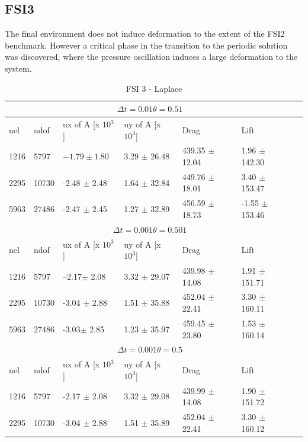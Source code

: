 \subsection{FSI3}
The final environment does not induce deformation to the extent of the FSI2 benchmark. However a critical phase in the transition to the periodic solution was discovered, where the pressure oscillation induces a large deformation to the system.
\begin{table}[h!]
\centering
\caption{FSI 3 - Laplace}
\label{my-label}
\begin{tabular}{ |p{1cm}||p{1cm}|p{2.5cm}|p{2.5cm}|p{2.7cm}|p{2.7cm}|p{1.2cm}|}
 \hline
  \multicolumn{6}{|c|}{$\Delta t = 0.01 \theta = 0.51$} \\
   \hline
nel & ndof & ux of A [x $10^{3}$]  &uy of A [x $10^{3}$]& Drag  & Lift \\
 \hline
1216 &5797& $-1.79 \pm  1.80$  & 3.29 $\pm$  26.48 & 439.35  $\pm$  12.04 &  1.96 $\pm$  142.30 \\
2295 &10730& -2.48 $\pm$  2.48 &1.64 $\pm$  32.84   & 449.76   $\pm$  18.01 &  3.40  $\pm$  153.47\\
5963 &27486 & -2.47   $\pm$  2.45 &1.27 $\pm$  32.89 & 456.59  $\pm$  18.73 &  -1.55  $\pm$  153.46\\
 \hline
  \multicolumn{6}{|c|}{$\Delta t = 0.001 \theta = 0.501$} \\
   \hline
 nel & ndof & ux of A [x $10^{3}$]  &uy of A [x $10^{3}$]& Drag  & Lift \\
1216 &5797& --2.17$\pm$  2.08 &     3.32     $\pm$  29.07 &439.98 $\pm$  14.08  &  1.91 $\pm$  151.71\\
2295 &10730& -3.04 $\pm$  2.88 &  1.51  $\pm$  35.88 & 452.04  $\pm$  22.41 &  3.30      $\pm$  160.11 \\
5963 &27486 & -3.03$\pm$  2.85 &  1.23 $\pm$  35.97  & 459.45  $\pm$  23.80 &  1.53  $\pm$  160.14 \\
\hline
\multicolumn{6}{|c|}{$\Delta t = 0.001 \theta = 0.5$} \\
   \hline
 nel & ndof & ux of A [x $10^{3}$]  &uy of A [x $10^{3}$]& Drag  & Lift \\
\hline
1216 &5797& -2.17  $\pm$   2.08 &  3.32 $\pm$   29.08  & 439.99  $\pm$   14.08  & 1.90 $\pm$  151.72 \\
2295 &10730& -3.04 $\pm$  2.88  & 1.51  $\pm$  35.89  & 452.04   $\pm$  22.41 &  3.30 $\pm$  160.12 \\
\hline
\end{tabular}
\end{table}



